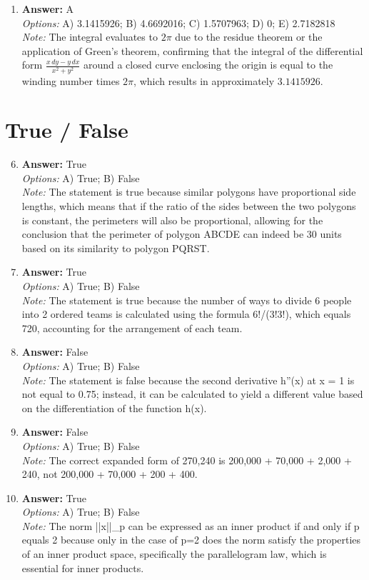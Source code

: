 \documentclass[12pt]{article}
\begin{document}
\begin{enumerate}[label=\arabic*.]
\item \textbf{Answer:} A
\\ \textit{Options:} A) 3.1415926; B) 4.6692016; C) 1.5707963; D) 0; E) 2.7182818
\\ \textit{Note:} The integral evaluates to \( 2\pi \) due to the residue theorem or the application of Green's theorem, confirming that the integral of the differential form \( \frac{x\,dy - y\,dx}{x^2 + y^2} \) around a closed curve enclosing the origin is equal to the winding number times \( 2\pi \), which results in approximately \( 3.1415926 \).
\end{enumerate}

\section*{True / False}
\begin{enumerate}[label=\arabic*.]
\setcounter{enumi}{5}
\item \textbf{Answer:} True
\\ \textit{Options:} A) True; B) False
\\ \textit{Note:} The statement is true because similar polygons have proportional side lengths, which means that if the ratio of the sides between the two polygons is constant, the perimeters will also be proportional, allowing for the conclusion that the perimeter of polygon ABCDE can indeed be 30 units based on its similarity to polygon PQRST.
\item \textbf{Answer:} True
\\ \textit{Options:} A) True; B) False
\\ \textit{Note:} The statement is true because the number of ways to divide 6 people into 2 ordered teams is calculated using the formula 6!/(3!3!), which equals 720, accounting for the arrangement of each team.
\item \textbf{Answer:} False
\\ \textit{Options:} A) True; B) False
\\ \textit{Note:} The statement is false because the second derivative h''(x) at x = 1 is not equal to 0.75; instead, it can be calculated to yield a different value based on the differentiation of the function h(x).
\item \textbf{Answer:} False
\\ \textit{Options:} A) True; B) False
\\ \textit{Note:} The correct expanded form of 270,240 is 200,000 + 70,000 + 2,000 + 240, not 200,000 + 70,000 + 200 + 400.
\item \textbf{Answer:} True
\\ \textit{Options:} A) True; B) False
\\ \textit{Note:} The norm ||x||\_p can be expressed as an inner product if and only if p equals 2 because only in the case of p=2 does the norm satisfy the properties of an inner product space, specifically the parallelogram law, which is essential for inner products.
\end{enumerate}
\end{document}
